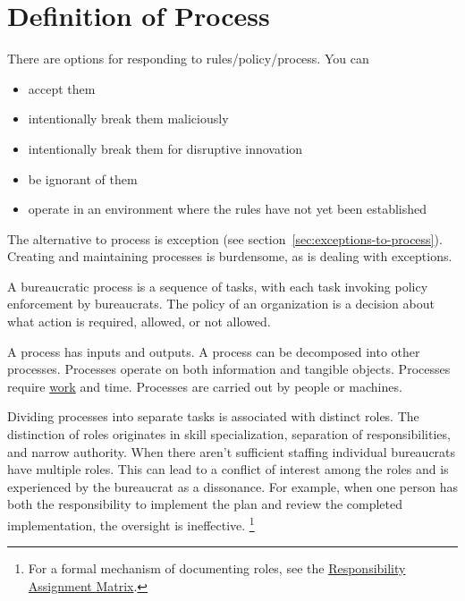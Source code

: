 \section{Definition of Process\label{sec:definition-of-process}}

There are options for responding to rules/policy/process. You can
\begin{itemize}
    \item accept them
    \item intentionally break them maliciously
    \item intentionally break them for disruptive innovation
    \item be ignorant of them
    \item operate in an environment where the rules have not yet been established
\end{itemize}



The alternative to process is exception (see section~\ref{sec:exceptions-to-process}). Creating and maintaining processes is burdensome, as is dealing with exceptions. 


A bureaucratic \gls{process} is a sequence of tasks, with each task invoking policy enforcement by bureaucrats. 
The policy of an organization is a decision about what action is required, allowed, or not allowed.


A process has inputs and outputs. 
A process can be decomposed into other processes. 
Processes operate on both information and tangible objects. 
Processes require \href{https://en.wikipedia.org/wiki/Work_(physics)}{work} and time. 
Processes are carried out by people or machines.

Dividing processes into separate tasks is associated with distinct roles. The distinction of roles originates in skill specialization, separation of responsibilities, and narrow authority. 
When there aren't sufficient staffing individual bureaucrats have multiple roles. This can lead to a conflict of interest among the roles and is experienced by the bureaucrat as a dissonance. For example, when one person has both the responsibility to implement the plan and review the completed implementation, the oversight is ineffective. \footnote{For a formal mechanism of documenting roles, see the 
\href{https://en.wikipedia.org/wiki/Responsibility_assignment_matrix}{Responsibility Assignment Matrix}.
}


